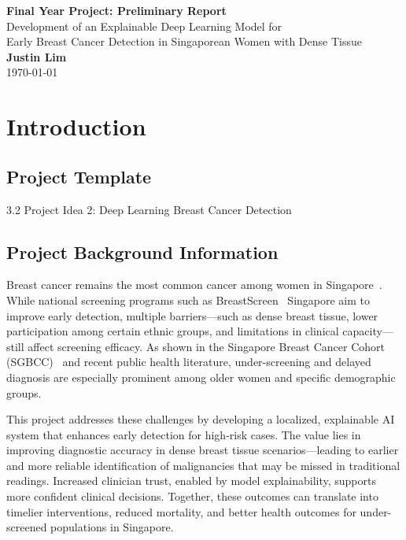 \documentclass[12pt]{article}
\begin{document}
\begin{titlepage}
    \centering
    \vspace*{\fill}

    {\LARGE \textbf{Final Year Project: Preliminary Report}}\\[2em]
    {\large Development of an Explainable Deep Learning Model for}\\[0.5em]
    {\large Early Breast Cancer Detection in Singaporean Women with Dense Tissue}\\[4em]

    {\large \textbf{Justin Lim}}\\[1em]
    {\large \today}

    \vspace*{\fill}
\end{titlepage}
\newpage
\tableofcontents
\newpage

\newpage
\section{Introduction}

\subsection{Project Template}
3.2 Project Idea 2: Deep Learning Breast Cancer Detection 

\subsection{Project Background Information}
Breast cancer remains the most common cancer among women in Singapore~\cite{10}. While national screening programs such as BreastScreen~\cite{6} Singapore aim to improve early detection, multiple barriers—such as dense breast tissue, lower participation among certain ethnic groups, and limitations in clinical capacity—still affect screening efficacy. As shown in the Singapore Breast Cancer Cohort (SGBCC)~\cite{10} and recent public health literature, under-screening and delayed diagnosis are especially prominent among older women and specific demographic groups. 

This project addresses these challenges by developing a localized, explainable AI system that enhances early detection for high-risk cases. The value lies in improving diagnostic accuracy in dense breast tissue scenarios—leading to earlier and more reliable identification of malignancies that may be missed in traditional readings. Increased clinician trust, enabled by model explainability, supports more confident clinical decisions. Together, these outcomes can translate into timelier interventions, reduced mortality, and better health outcomes for under-screened populations in Singapore.
\end{document}
